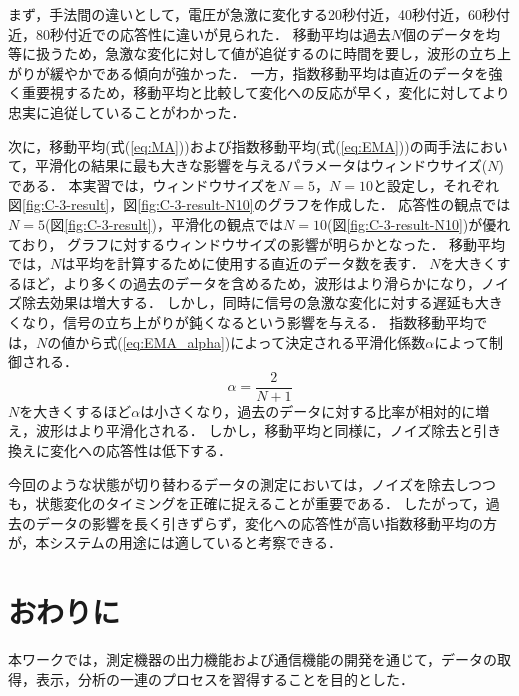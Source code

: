 まず，手法間の違いとして，電圧が急激に変化する20秒付近，40秒付近，60秒付近，80秒付近での応答性に違いが見られた．
移動平均は過去$N$個のデータを均等に扱うため，急激な変化に対して値が追従するのに時間を要し，波形の立ち上がりが緩やかである傾向が強かった．
一方，指数移動平均は直近のデータを強く重要視するため，移動平均と比較して変化への反応が早く，変化に対してより忠実に追従していることがわかった．

次に，移動平均(式(\ref{eq:MA}))および指数移動平均(式(\ref{eq:EMA}))の両手法において，平滑化の結果に最も大きな影響を与えるパラメータはウィンドウサイズ($N$)である．
本実習では，ウィンドウサイズを$N=5$，$N=10$と設定し，それぞれ図\ref{fig:C-3-result}，図\ref{fig:C-3-result-N10}のグラフを作成した．
応答性の観点では$N=5$(図\ref{fig:C-3-result})，平滑化の観点では$N=10$(図\ref{fig:C-3-result-N10})が優れており，
グラフに対するウィンドウサイズの影響が明らかとなった．
移動平均では，$N$は平均を計算するために使用する直近のデータ数を表す．
$N$を大きくするほど，より多くの過去のデータを含めるため，波形はより滑らかになり，ノイズ除去効果は増大する．
しかし，同時に信号の急激な変化に対する遅延も大きくなり，信号の立ち上がりが鈍くなるという影響を与える．
指数移動平均では，$N$の値から式(\ref{eq:EMA_alpha})によって決定される平滑化係数$\alpha$によって制御される．
\begin{equation}
  \alpha = \frac{2}{N+1} \label{eq:EMA_alpha}
\end{equation}
$N$を大きくするほど$\alpha$は小さくなり，過去のデータに対する比率が相対的に増え，波形はより平滑化される．
しかし，移動平均と同様に，ノイズ除去と引き換えに変化への応答性は低下する．

今回のような状態が切り替わるデータの測定においては，ノイズを除去しつつも，状態変化のタイミングを正確に捉えることが重要である．
したがって，過去のデータの影響を長く引きずらず，変化への応答性が高い指数移動平均の方が，本システムの用途には適していると考察できる．



\clearpage

\section{おわりに} 

本ワークでは，測定機器の出力機能および通信機能の開発を通じて，データの取得，表示，分析の一連のプロセスを習得することを目的とした．


